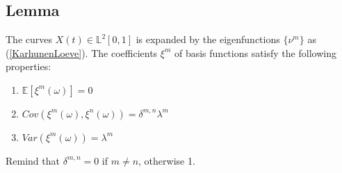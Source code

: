 \documentclass[11pt,twoside,a4paper]{article}
\begin{document}
	\subsection{Lemma} \label{Proof1}
	The curves $X(t) \in \mathbb{L}^2[0,1]$ is expanded by the eigenfunctions $\{\nu^m\}$ as (\ref{KarhunenLoeve}). The coefficients $\xi^{m}$ of basis functions satisfy the following properties:
	\begin{enumerate}
		\item $\mathbb{E}\left[\xi^m(\omega)\right] = 0$
		\item $Cov\left(\xi^m(\omega), \xi^n(\omega)\right) = \delta^{m,n}\lambda^m$%
		\item $Var\left(\xi^m(\omega)\right) = \lambda^m$
	\end{enumerate}
	Remind that $\delta^{m,n} = 0$ if $m \neq n$, otherwise 1.
\end{document}
